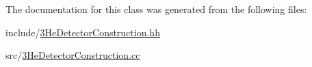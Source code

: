 The documentation for this class was generated from the following files\+:\begin{DoxyCompactItemize}
\item 
include/\hyperlink{3HeDetectorConstruction_8hh}{3\+He\+Detector\+Construction.\+hh}\item 
src/\hyperlink{3HeDetectorConstruction_8cc}{3\+He\+Detector\+Construction.\+cc}\end{DoxyCompactItemize}
